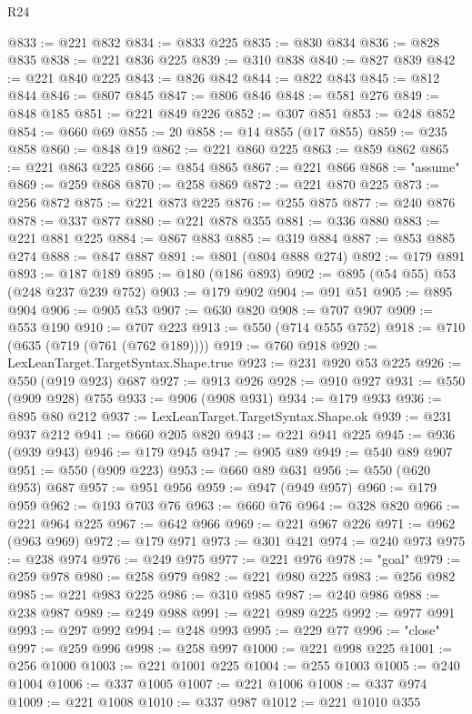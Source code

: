 \begin{lexlean}{R24}
\begin{coremodule}
@833 := @221 @832
@834 := @833 @225
@835 := @830 @834
@836 := @828 @835
@838 := @221 @836 @225
@839 := @310 @838
@840 := @827 @839
@842 := @221 @840 @225
@843 := @826 @842
@844 := @822 @843
@845 := @812 @844
@846 := @807 @845
@847 := @806 @846
@848 := @581 @276
@849 := @848 @185
@851 := @221 @849 @226
@852 := @307 @851
@853 := @248 @852
@854 := @660 @69
@855 := 20
@858 := @14 @855 (@17 @855)
@859 := @235 @858
@860 := @848 @19
@862 := @221 @860 @225
@863 := @859 @862
@865 := @221 @863 @225
@866 := @854 @865
@867 := @221 @866
@868 := "assume"
@869 := @259 @868
@870 := @258 @869
@872 := @221 @870 @225
@873 := @256 @872
@875 := @221 @873 @225
@876 := @255 @875
@877 := @240 @876
@878 := @337 @877
@880 := @221 @878 @355
@881 := @336 @880
@883 := @221 @881 @225
@884 := @867 @883
@885 := @319 @884
@887 := @853 @885 @274
@888 := @847 @887
@891 := @801 (@804 @888 @274)
@892 := @179 @891
@893 := @187 @189
@895 := @180 (@186 @893)
@902 := @895 (@54 @55) @53 (@248 @237 @239 @752)
@903 := @179 @902
@904 := @91 @51
@905 := @895 @904
@906 := @905 @53
@907 := @630 @820
@908 := @707 @907
@909 := @553 @190
@910 := @707 @223
@913 := @550 (@714 @555 @752)
@918 := @710 (@635 (@719 (@761 (@762 @189))))
@919 := @760 @918
@920 := LexLeanTarget.TargetSyntax.Shape.true
@923 := @231 @920 @53 @225
@926 := @550 (@919 @923) @687
@927 := @913 @926
@928 := @910 @927
@931 := @550 (@909 @928) @755
@933 := @906 (@908 @931)
@934 := @179 @933
@936 := @895 @80 @212
@937 := LexLeanTarget.TargetSyntax.Shape.ok
@939 := @231 @937 @212
@941 := @660 @205 @820
@943 := @221 @941 @225
@945 := @936 (@939 @943)
@946 := @179 @945
@947 := @905 @89
@949 := @540 @89 @907
@951 := @550 (@909 @223)
@953 := @660 @89 @631
@956 := @550 (@620 @953) @687
@957 := @951 @956
@959 := @947 (@949 @957)
@960 := @179 @959
@962 := @193 @703 @76
@963 := @660 @76
@964 := @328 @820
@966 := @221 @964 @225
@967 := @642 @966
@969 := @221 @967 @226
@971 := @962 (@963 @969)
@972 := @179 @971
@973 := @301 @421
@974 := @240 @973
@975 := @238 @974
@976 := @249 @975
@977 := @221 @976
@978 := "goal"
@979 := @259 @978
@980 := @258 @979
@982 := @221 @980 @225
@983 := @256 @982
@985 := @221 @983 @225
@986 := @310 @985
@987 := @240 @986
@988 := @238 @987
@989 := @249 @988
@991 := @221 @989 @225
@992 := @977 @991
@993 := @297 @992
@994 := @248 @993
@995 := @229 @77
@996 := "close"
@997 := @259 @996
@998 := @258 @997
@1000 := @221 @998 @225
@1001 := @256 @1000
@1003 := @221 @1001 @225
@1004 := @255 @1003
@1005 := @240 @1004
@1006 := @337 @1005
@1007 := @221 @1006
@1008 := @337 @974
@1009 := @221 @1008
@1010 := @337 @987
@1012 := @221 @1010 @355

\end{coremodule}
\end{lexlean}
